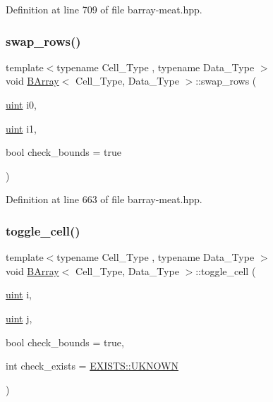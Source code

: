 Definition at line 709 of file barray-\/meat.\+hpp.

\mbox{\label{class_b_array_a742773803481c18e2865b2b2a1e68949}} 
\subsubsection{\texorpdfstring{swap\+\_\+rows()}{swap\_rows()}}
{\footnotesize\ttfamily template$<$typename Cell\+\_\+\+Type , typename Data\+\_\+\+Type $>$ \\
void \hyperlink{class_b_array}{B\+Array}$<$ Cell\+\_\+\+Type, Data\+\_\+\+Type $>$\+::swap\+\_\+rows (\begin{DoxyParamCaption}\item[{\hyperlink{typedefs_8hpp_a91ad9478d81a7aaf2593e8d9c3d06a14}{uint}}]{i0,  }\item[{\hyperlink{typedefs_8hpp_a91ad9478d81a7aaf2593e8d9c3d06a14}{uint}}]{i1,  }\item[{bool}]{check\+\_\+bounds = {\ttfamily true} }\end{DoxyParamCaption})\hspace{0.3cm}{\ttfamily [inline]}}



Definition at line 663 of file barray-\/meat.\+hpp.

\mbox{\label{class_b_array_a2ab2b200b329abc718cfb3574f566cf6}} 
\subsubsection{\texorpdfstring{toggle\+\_\+cell()}{toggle\_cell()}}
{\footnotesize\ttfamily template$<$typename Cell\+\_\+\+Type , typename Data\+\_\+\+Type $>$ \\
void \hyperlink{class_b_array}{B\+Array}$<$ Cell\+\_\+\+Type, Data\+\_\+\+Type $>$\+::toggle\+\_\+cell (\begin{DoxyParamCaption}\item[{\hyperlink{typedefs_8hpp_a91ad9478d81a7aaf2593e8d9c3d06a14}{uint}}]{i,  }\item[{\hyperlink{typedefs_8hpp_a91ad9478d81a7aaf2593e8d9c3d06a14}{uint}}]{j,  }\item[{bool}]{check\+\_\+bounds = {\ttfamily true},  }\item[{int}]{check\+\_\+exists = {\ttfamily \hyperlink{namespace_e_x_i_s_t_s_a81eb362d951445c658942a433afddb97}{E\+X\+I\+S\+T\+S\+::\+U\+K\+N\+O\+WN}} }\end{DoxyParamCaption})\hspace{0.3cm}{\ttfamily [inline]}}



